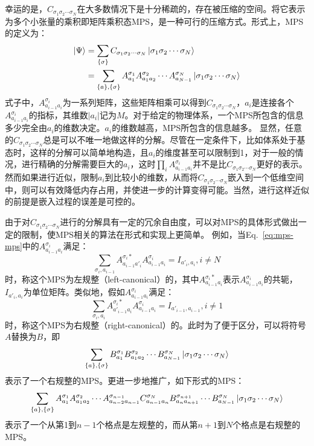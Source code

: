 \documentclass{article}
\begin{document}
幸运的是，$C_{\sigma_1\sigma_2\cdots\sigma_N }$在大多数情况下是十分稀疏的，存在被压缩的空间。将它表示为多个小张量的乘积即矩阵乘积态MPS，是一种可行的压缩方式。形式上，MPS的定义为：
\begin{equation}
\label{eq:mps-mps}
\begin{aligned}
    | \Psi \rangle & = \sum_{\{\sigma\}} C_{\sigma_1\sigma_2\cdots\sigma_N }  \ket{ \sigma_1\sigma_2\cdots\sigma_N } \\ 
    & = \sum_{\{a\},\{\sigma\}}
     A^{\sigma_1}_{a_1} A^{\sigma_2}_{a_1a_2} \cdots
           A^{\sigma_N}_{a_{N-1}}  \ket{ \sigma_1\sigma_2\cdots\sigma_N }
\end{aligned}
\end{equation}
式子中，$A^{\sigma_i}_{a_{i-1}a_{i}}$为一系列矩阵，这些矩阵相乘可以得到$C_{\sigma_1\sigma_2\cdots\sigma_N }$，$a_i$是连接各个$A^{\sigma_i}_{a_{i-1}a_{i}}$的指标，其维数$|a_i|$记为$M$。对于给定的物理体系，一个MPS所包含的信息多少完全由$a_i$的维数决定。$a_i$的维数越高，MPS所包含的信息越多。
显然，任意的$C_{\sigma_1\sigma_2\cdots\sigma_N }$总是可以不唯一地做这样的分解。尽管在一定条件下，比如体系处于基态时，这样的分解可以简单地构造，且$a_i$的维度甚至可以限制到1，对于一般的情况，进行精确的分解需要巨大的$a_i$，这时$\prod_{i} A^{\sigma_i}_{a_{i-1}a_{i}}$并不是比$C_{\sigma_1\sigma_2\cdots\sigma_N }$更好的表示。然而如果进行近似，限制$a_i$到比较小的维数，从而将$C_{\sigma_1\sigma_2\cdots\sigma_N }$嵌入到一个低维空间中，则可以有效降低内存占用，并使进一步的计算变得可能。当然，进行这样近似的前提是嵌入过程的误差是可控的。

由于对$C_{\sigma_1\sigma_2\cdots\sigma_N }$进行的分解具有一定的冗余自由度，可以对MPS的具体形式做出一定的限制，使MPS相关的算法在形式和实现上更简单。
例如，当Eq.~\ref{eq:mps-mps}中的$A^{\sigma_i}_{a_{i-1}a_{i}}$满足：
\begin{equation}
\label{eq:left-cano}
    \sum_{\sigma_i, a_{i-1}}A^{\sigma_i*}_{a_{i-1}a'_{i}} A^{\sigma_i}_{a_{i-1}a_{i}} = I_{a'_i, a_i}, i \neq N
\end{equation}
时，称这个MPS为左规整（left-canonical）的，其中$A^{\sigma_i*}_{a_{i-1}a_{i}}$表示$A^{\sigma_i}_{a_{i-1}a_{i}}$的共轭，$I_{a'_i, a_i}$为单位矩阵。类似地，假如$A^{\sigma_i}_{a_{i-1}a_{i}}$满足：
\begin{equation}
    \sum_{\sigma_i, a_{i}}A^{\sigma_i*}_{a'_{i-1}a_{i}} A^{\sigma_i}_{a_{i-1}a_{i}} = I_{a'_{i-1}, a_{i-1}}, i \neq 1
\end{equation}
时，称这个MPS为右规整（right-canonical）的。此时为了便于区分，可以将符号$A$替换为$B$，即
$$
\sum_{\{a\},\{\sigma\}}
     B^{\sigma_1}_{a_1} B^{\sigma_2}_{a_1a_2} \cdots
           B^{\sigma_N}_{a_{N-1}}  \ket{ \sigma_1\sigma_2\cdots\sigma_N }
$$
表示了一个右规整的MPS。更进一步地推广，如下形式的MPS：
\begin{equation}
\sum_{\{a\},\{\sigma\}}
     A^{\sigma_1}_{a_1} A^{\sigma_2}_{a_1a_2} \cdots A^{\sigma_{n-1}}_{a_{n-2}a_{n-1}}C^{\sigma_N}_{a_{n-1}a_n}
     B^{\sigma_{n+1}}_{a_n a_{n+1}} \cdots
           B^{\sigma_N}_{a_{N-1}}  \ket{ \sigma_1\sigma_2\cdots\sigma_N }
\end{equation}
表示了一个从第1到$n-1$个格点是左规整的，而从第$n+1$到$N$个格点是右规整的MPS。
\end{document}
